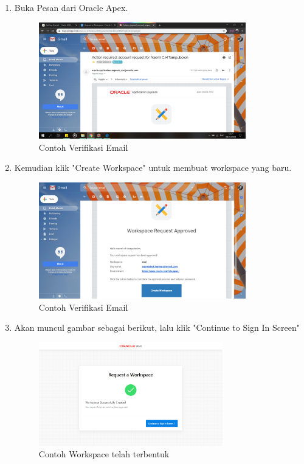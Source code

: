 \begin{enumerate}
\item Buka Pesan dari Oracle Apex.
    \begin{figure}[!htbp]
    \centering
    \includegraphics[width=9cm]{picture/13.png}
    \caption{Contoh Verifikasi Email}
    \end{figure}
    
\item Kemudian klik "Create Workspace" untuk membuat workspace yang baru.
    \begin{figure}[!htbp]
    \centering
    \includegraphics[width=9cm]{picture/14.png}
    \caption{Contoh Verifikasi Email}
    \end{figure}
    
\newpage
\item Akan muncul gambar sebagai berikut, lalu klik "Continue to Sign In Screen"
    \begin{figure}[!htbp]
    \centering
    \includegraphics[width=8cm]{picture/15.png}
    \caption{Contoh Workspace telah terbentuk}
    \end{figure}
    

\end{enumerate}
